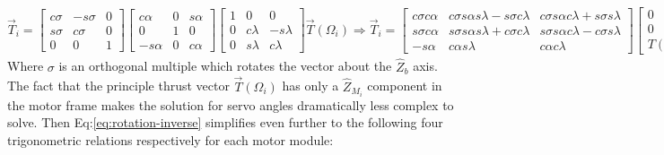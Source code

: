 \begin{subequations}
\begin{equation}
\vec{T}_i=\begin{bmatrix}
c\sigma & -s\sigma & 0\\
s\sigma & c\sigma & 0\\
0 & 0 & 1 
\end{bmatrix}
\begin{bmatrix}
c\alpha & 0 & s\alpha\\
0 & 1 & 0\\
-s\alpha & 0 & c\alpha
\end{bmatrix}
\begin{bmatrix}
1 & 0 & 0\\
0 & c\lambda & -s\lambda\\
0 & s\lambda & c\lambda
\end{bmatrix}\vec{T}(\Omega_i)
\end{equation}
\begin{equation}
\Rightarrow\vec{T}_i=\begin{bmatrix}
c\sigma c\alpha & c\sigma s\alpha s\lambda - s\sigma c\lambda & c\sigma s\alpha c\lambda + s\sigma s\lambda\\
s\sigma c\alpha & s\sigma s\alpha s\lambda + c\sigma c\lambda & s\sigma s\alpha c\lambda - c\sigma s\lambda\\
-s\alpha & c\alpha s\lambda & c\alpha c\lambda
\end{bmatrix}
\begin{bmatrix}
0\\
0\\
T(\Omega_i)
\end{bmatrix}
\end{equation}
\begin{equation}\label{eq:rotation-inverse}
\Rightarrow
\begin{bmatrix}
T_x\\
T_y\\
T_z
\end{bmatrix}
=\begin{bmatrix}
s\sigma s\lambda + c\sigma s\alpha c\lambda\\
s\sigma s\alpha c\lambda - c\sigma s\alpha\\
c\alpha c\lambda
\end{bmatrix}
T(\Omega_i)
\end{equation}
\end{subequations}
Where $\sigma$ is an orthogonal multiple which rotates the vector about the $\hat{Z}_b$ axis. The fact that the principle thrust vector $\vec{T}(\Omega_i)$ has only a $\hat{Z}_{M_i}$ component in the motor frame makes the solution for servo angles dramatically less complex to solve. Then Eq:\ref{eq:rotation-inverse} simplifies even further to the following four trigonometric relations respectively for each motor module:
